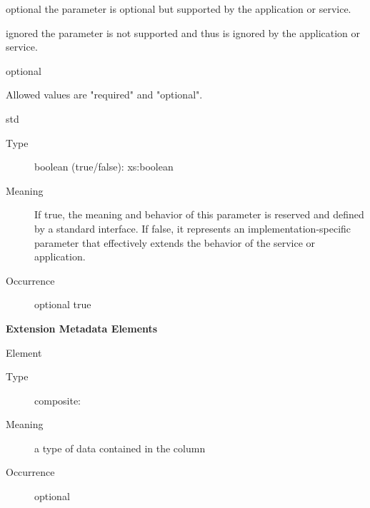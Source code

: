 \documentclass[11pt,a4paper]{ivoa}
\begin{document}
\begin{generated}
\begin{bigdescription}
\begin{description}
\begin{longtermsdescription}
\item[optional]
                  the parameter is optional but supported by the application or
                  service.
               
\item[ignored]
                  the parameter is not supported and thus is ignored by the 
                  application or service.
               
\end{longtermsdescription}
optional
\item[Comment] 
                     Allowed values are {"}required{"} and {"}optional{"}.
                  
\end{description}
\item[std]
\begin{description}
\item[Type] boolean (true/false): xs:boolean
\item[Meaning] 
                     If true, the meaning and behavior of this parameter is
                     reserved and defined by a standard interface.  If
                     false, it represents an implementation-specific
                     parameter that effectively extends the behavior of the 
                     service or application.  
                  
\item[Occurrence] optional
true
\end{description}


\end{bigdescription}\endgroup



\vspace{0.5ex}\noindent\textbf{ Extension Metadata Elements}

\begingroup\small\begin{bigdescription}\item[Element \xmlel{dataType}]
\begin{description}
\item[Type] composite: 
\item[Meaning] 
                        a type of data contained in the column
                     
\item[Occurrence] optional

\end{description}


\end{bigdescription}\endgroup

\endgroup
\end{generated}
\end{document}
